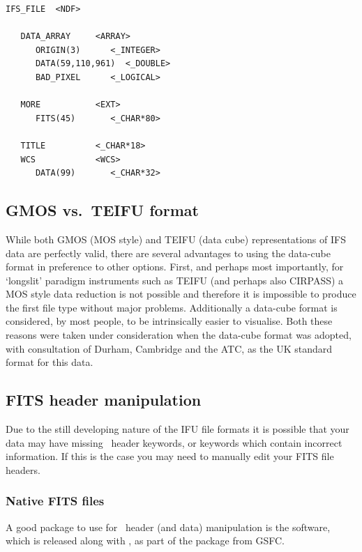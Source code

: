 \documentclass[twoside,11pt]{article}
\newcommand{\htmladdnormallink}[2]{#1}
\newcommand{\xlabel}[1]{}
\begin{document}
\begin{\htmlonly}
\small\begin{verbatim}
IFS_FILE  <NDF>

   DATA_ARRAY     <ARRAY>
      ORIGIN(3)      <_INTEGER>
      DATA(59,110,961)  <_DOUBLE>
      BAD_PIXEL      <_LOGICAL>  

   MORE           <EXT>
      FITS(45)       <_CHAR*80>

   TITLE          <_CHAR*18> 
   WCS            <WCS>      
      DATA(99)       <_CHAR*32>
\end{verbatim}\normalsize

\subsection{\xlabel{sc16_fits2ndf}GMOS vs.\ TEIFU format\label{sc16_fits2ndf}}

While both GMOS (MOS style) and TEIFU (data cube) representations of
IFS data are perfectly valid, there are several advantages to using the
data-cube format in preference to other options.  First, and perhaps
most importantly, for `longslit' paradigm instruments such as TEIFU
(and perhaps also CIRPASS) a MOS style data reduction is not possible
and therefore it is impossible to produce the first file type without
major problems.  Additionally a data-cube format is considered, by most
people, to be intrinsically easier to visualise.  Both these reasons
were taken under consideration when the data-cube format was adopted,
with consultation of Durham, Cambridge and the ATC, as the UK standard
format for this data.

\subsection{\xlabel{sc16_fitshdr}FITS header manipulation\label{sc16_fitshdr}}

Due to the still developing nature of the IFU file formats it is
possible that your data may have missing \FITSref\  header keywords, or
keywords which contain incorrect information.  If this is the case you
may need to manually edit your FITS file headers.

\subsubsection{Native FITS files}
 
A good package to use for \FITSref\ header (and data) manipulation is the
\htmladdnormallink{\FTOOLS}{
http://heasarc.gsfc.nasa.gov/docs/software/lheasoft/ftools/} software,
which is released along with
\htmladdnormallink{\XANADU}{http://heasarc.gsfc.nasa.gov/docs/software/lheasoft/xanadu/},
as part of the
\htmladdnormallink{\HEASOFT}{http://heasarc.gsfc.nasa.gov/docs/software/lheasoft/}
package from GSFC.


\end{\htmlonly}
\end{document}
